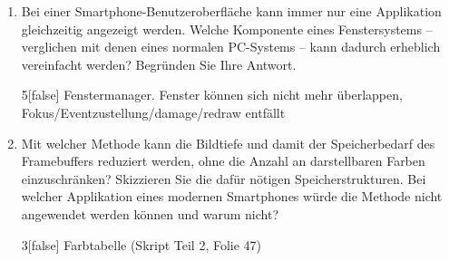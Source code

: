 
\begin{enumerate}

\item Bei einer Smartphone-Benutzeroberfläche kann immer nur eine Applikation
gleichzeitig angezeigt werden. Welche Komponente eines Fenstersystems --
verglichen mit denen eines normalen PC-Systems -- kann dadurch erheblich vereinfacht
werden? Begründen Sie Ihre Antwort.

\begin{solution}{5}[false]
Fenstermanager. Fenster können sich nicht mehr überlappen,
Fokus/Eventzustellung/damage/redraw entfällt 
\end{solution}

\item Mit welcher Methode kann die Bildtiefe und damit der Speicherbedarf des
Framebuffers reduziert werden, ohne die Anzahl an darstellbaren Farben
einzuschränken? Skizzieren Sie die dafür nötigen Speicherstrukturen. Bei welcher
Applikation eines modernen Smartphones würde die Methode nicht angewendet werden
können und warum nicht?

\begin{solution}{3}[false]
Farbtabelle (Skript Teil 2, Folie 47)
\end{solution}

\end{enumerate}
